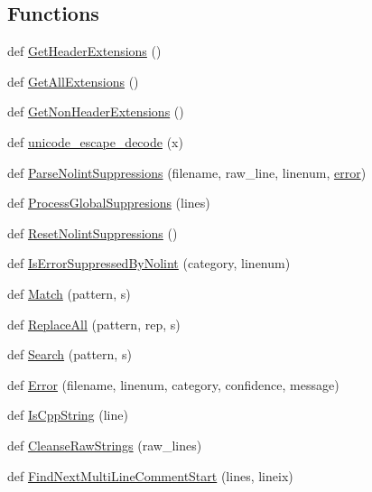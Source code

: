\subsection*{Functions}
\begin{DoxyCompactItemize}
\item 
def \hyperlink{namespacecpplint_a6a680a2259f786ae86a040fbeece3619}{Get\+Header\+Extensions} ()
\item 
def \hyperlink{namespacecpplint_a3f85c074cef71124a9375cee804fad84}{Get\+All\+Extensions} ()
\item 
def \hyperlink{namespacecpplint_ad0e3369de3ef72be0857453194bcf63d}{Get\+Non\+Header\+Extensions} ()
\item 
def \hyperlink{namespacecpplint_af530575e5a1ca099904526eedee174eb}{unicode\+\_\+escape\+\_\+decode} (x)
\item 
def \hyperlink{namespacecpplint_a52ae8f1d9436d14ddb94ceed06026c43}{Parse\+Nolint\+Suppressions} (filename, raw\+\_\+line, linenum, \hyperlink{_07copy_08_2_read_camera_model_8m_ac546fdc9911f4a876dbfaffbc7426f8b}{error})
\item 
def \hyperlink{namespacecpplint_a316dc237dc0cde7bafec3c30d5624cac}{Process\+Global\+Suppresions} (lines)
\item 
def \hyperlink{namespacecpplint_a1d92dc3582da477f98ab5b85bd13fea0}{Reset\+Nolint\+Suppressions} ()
\item 
def \hyperlink{namespacecpplint_a0b9e1f991f1a3d02cda3234784241d1f}{Is\+Error\+Suppressed\+By\+Nolint} (category, linenum)
\item 
def \hyperlink{namespacecpplint_a73ac2ecfcd9c52b4a3755176c68dea7e}{Match} (pattern, s)
\item 
def \hyperlink{namespacecpplint_a1b85a5657aeab8b4a0ed85e06aed3576}{Replace\+All} (pattern, rep, s)
\item 
def \hyperlink{namespacecpplint_a75eae6bb88590e904f751502c8ee4bab}{Search} (pattern, s)
\item 
def \hyperlink{namespacecpplint_ae51e76d6d73b36b9e965d2ac9d21d7c2}{Error} (filename, linenum, category, confidence, message)
\item 
def \hyperlink{namespacecpplint_a034b93866a853c2e21577fb371a7fa9d}{Is\+Cpp\+String} (line)
\item 
def \hyperlink{namespacecpplint_a61b3f81ef467e7cb417d13e9051180fc}{Cleanse\+Raw\+Strings} (raw\+\_\+lines)
\item 
def \hyperlink{namespacecpplint_af0404401670283c9d4f948180e427401}{Find\+Next\+Multi\+Line\+Comment\+Start} (lines, lineix)

\end{DoxyCompactItemize}
